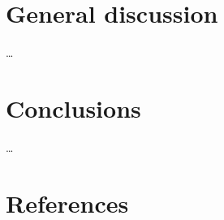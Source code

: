 \documentclass[12pt,]{book}
\begin{document}
\chapter{General discussion}\label{general-discussion}

\ldots{}

\chapter{Conclusions}\label{conclusions}

\ldots{}

\chapter*{References}\label{references}


\singlespacing
\sloppy

\noindent

\setlength{\parindent}{-0.20in} \setlength{\leftskip}{0.20in}
\setlength{\parskip}{8pt}


\end{document}
